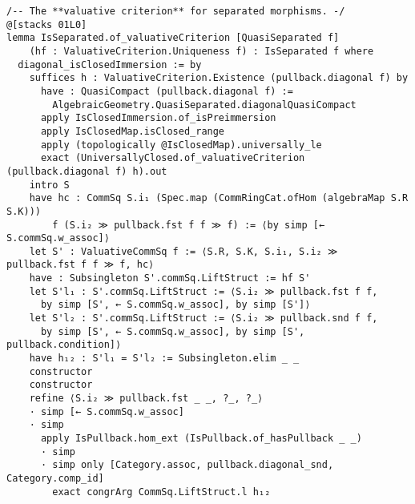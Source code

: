 \documentclass{article}
\begin{document}
\begin{lstlisting}[language=Lean, caption={ValuativeCriterion.lean}]
/-- The **valuative criterion** for separated morphisms. -/
@[stacks 01L0]
lemma IsSeparated.of_valuativeCriterion [QuasiSeparated f]
    (hf : ValuativeCriterion.Uniqueness f) : IsSeparated f where
  diagonal_isClosedImmersion := by
    suffices h : ValuativeCriterion.Existence (pullback.diagonal f) by
      have : QuasiCompact (pullback.diagonal f) :=
        AlgebraicGeometry.QuasiSeparated.diagonalQuasiCompact
      apply IsClosedImmersion.of_isPreimmersion
      apply IsClosedMap.isClosed_range
      apply (topologically @IsClosedMap).universally_le
      exact (UniversallyClosed.of_valuativeCriterion (pullback.diagonal f) h).out
    intro S
    have hc : CommSq S.i₁ (Spec.map (CommRingCat.ofHom (algebraMap S.R S.K)))
        f (S.i₂ ≫ pullback.fst f f ≫ f) := ⟨by simp [← S.commSq.w_assoc]⟩
    let S' : ValuativeCommSq f := ⟨S.R, S.K, S.i₁, S.i₂ ≫ pullback.fst f f ≫ f, hc⟩
    have : Subsingleton S'.commSq.LiftStruct := hf S'
    let S'l₁ : S'.commSq.LiftStruct := ⟨S.i₂ ≫ pullback.fst f f,
      by simp [S', ← S.commSq.w_assoc], by simp [S']⟩
    let S'l₂ : S'.commSq.LiftStruct := ⟨S.i₂ ≫ pullback.snd f f,
      by simp [S', ← S.commSq.w_assoc], by simp [S', pullback.condition]⟩
    have h₁₂ : S'l₁ = S'l₂ := Subsingleton.elim _ _
    constructor
    constructor
    refine ⟨S.i₂ ≫ pullback.fst _ _, ?_, ?_⟩
    · simp [← S.commSq.w_assoc]
    · simp
      apply IsPullback.hom_ext (IsPullback.of_hasPullback _ _)
      · simp
      · simp only [Category.assoc, pullback.diagonal_snd, Category.comp_id]
        exact congrArg CommSq.LiftStruct.l h₁₂


\end{lstlisting}
\end{document}

